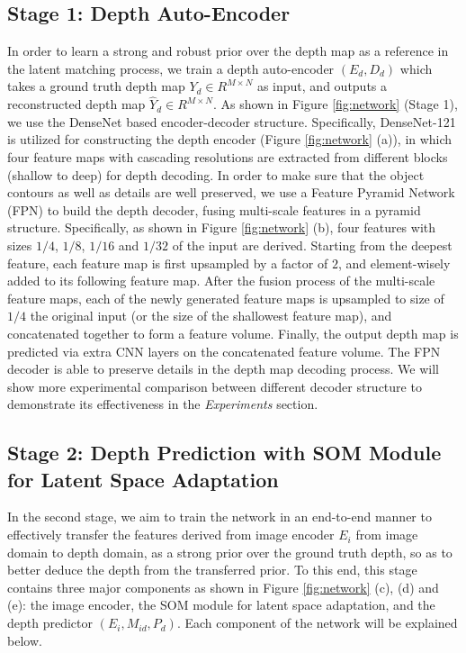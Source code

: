 \documentclass[letterpaper]{article} \usepackage{aaai20}  \usepackage{times}  \usepackage{helvet} \usepackage{courier}  \usepackage{graphicx} \frenchspacing  \setlength{\pdfpagewidth}{8.5in}  \setlength{\pdfpageheight}{11in}  \usepackage{epsfig}
\begin{document}
    \subsection{Stage 1: Depth Auto-Encoder}
    \label{subsec:ae}
    In order to learn a strong and robust prior over the depth map as a reference in the latent matching process, we train a depth auto-encoder $(E_d, D_d)$ which takes a ground truth depth map $Y_d\in R^{M \times N}$ as input, and outputs a reconstructed depth map $\hat{Y}_d\in R^{M \times N}$. As shown in Figure \ref{fig:network} (Stage 1), we use the DenseNet based encoder-decoder structure. Specifically, DenseNet-121 is utilized for constructing the depth encoder (Figure \ref{fig:network} (a)), in which four feature maps with cascading resolutions are extracted from different blocks (shallow to deep) for depth decoding. In order to make sure that the object contours as well as details are well preserved, we use a Feature Pyramid Network (FPN) to build the depth decoder, fusing multi-scale features in a pyramid structure. Specifically, as shown in Figure \ref{fig:network} (b), four features with sizes $1/4$, $1/8$, $1/16$ and $1/32$ of the input are derived. Starting from the deepest feature, each feature map is first upsampled by a factor of $2$, and element-wisely added to its following feature map. After the fusion process of the multi-scale feature maps, each of the newly generated feature maps is upsampled to size of $1/4$ the original input (or the size of the shallowest feature map), and concatenated together to form a feature volume. Finally, the output depth map is predicted via extra CNN layers on the concatenated feature volume. The FPN decoder is able to preserve details in the depth map decoding process. We will show more experimental comparison between different decoder structure to demonstrate its effectiveness in the \emph{Experiments} section.
    
    \subsection{Stage 2: Depth Prediction with SOM Module for Latent Space Adaptation}
     In the second stage, we aim to train the network in an end-to-end manner to effectively transfer the features derived from image encoder $E_i$ from image domain to depth domain, as a strong prior over the ground truth depth, so as to better deduce the depth from the transferred prior. To this end, this stage contains three major components as shown in Figure \ref{fig:network} (c), (d) and (e): the image encoder, the SOM module for latent space adaptation, and the depth predictor $(E_i, M_{id}, P_d)$. Each component of the network will be explained below. 
    
\end{document}
